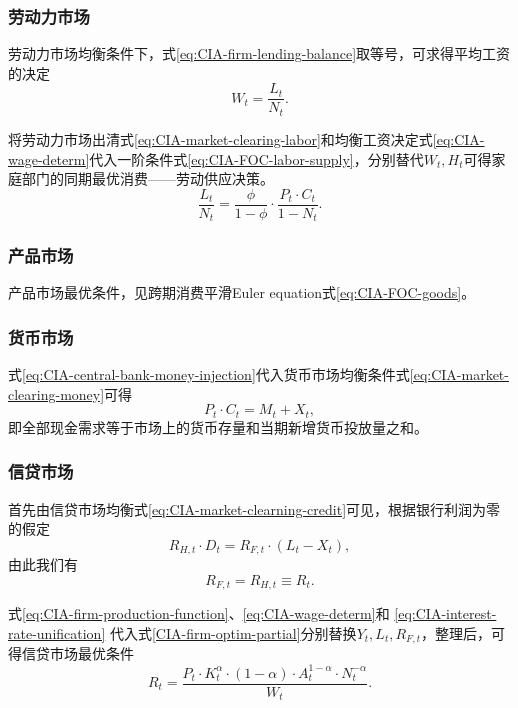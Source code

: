 \subsubsection{劳动力市场}
劳动力市场均衡条件下，式\eqref{eq:CIA-firm-lending-balance}取等号，可求得平均工资的决定
\begin{equation}
  \label{eq:CIA-wage-determ}
  W_t = \frac{L_t}{N_t}.
\end{equation}

将劳动力市场出清式\eqref{eq:CIA-market-clearing-labor}和均衡工资决定式\eqref{eq:CIA-wage-determ}代入一阶条件式\eqref{eq:CIA-FOC-labor-supply}，分别替代$W_t, H_t$可得家庭部门的同期最优消费——劳动供应决策。
\begin{equation}
  \label{CIA-optimal-labor-mkt-intratemp}
  \frac{L_t}{N_t}=\frac{\phi}{1-\phi} \cdot \frac{P_t \cdot C_t}{1-N_t}.
\end{equation}

\subsubsection{产品市场}
产品市场最优条件，见跨期消费平滑Euler equation式\eqref{eq:CIA-FOC-goods}。

\subsubsection{货币市场}
式\eqref{eq:CIA-central-bank-money-injection}代入货币市场均衡条件式\eqref{eq:CIA-market-clearing-money}可得
\begin{equation}
  \label{eq:CIA-market-clearing-money-flow}
  P_t \cdot C_t = M_t + X_t,
\end{equation}
即全部现金需求等于市场上的货币存量和当期新增货币投放量之和。

\subsubsection{信贷市场}
首先由信贷市场均衡式\eqref{eq:CIA-market-clearning-credit}可见，根据银行利润为零的假定
\begin{equation*}
  R_{H,t} \cdot D_t = R_{F,t} \cdot \left(L_t - X_t \right),
\end{equation*}
由此我们有
\begin{equation}
  \label{eq:CIA-interest-rate-unification}
  R_{F,t} = R_{H,t} \equiv R_t.
\end{equation}

式\eqref{eq:CIA-firm-production-function}、\eqref{eq:CIA-wage-determ}和
\eqref{eq:CIA-interest-rate-unification} 代入式\eqref{CIA-firm-optim-partial}分别替换$Y_t, L_t, R_{F,t}$，整理后，可得信贷市场最优条件
\begin{equation}
  \label{CIA-optimal-credit-mkt}
  R_t = \frac{P_t \cdot K_t^{\alpha} \cdot (1-\alpha) \cdot A_t^{1- \alpha} \cdot N_t^{-\alpha}}{W_t}.
\end{equation}

